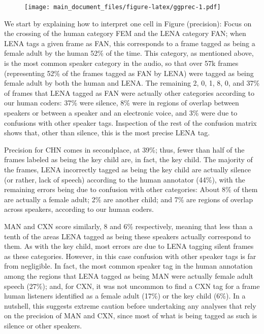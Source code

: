 \documentclass[english,floatsintext,man]{apa6}
\begin{document}
\begin{figure}
\centering
\texttt{[image: main\_document\_files/figure-latex/ggprec-1.pdf]}
\caption{}
\end{figure}

We start by explaining how to interpret one cell in Figure (precision):
Focus on the crossing of the human category FEM and the LENA category
FAN; when LENA tags a given frame as FAN, this corresponds to a frame
tagged as being a female adult by the human 52\% of the time. This
category, as mentioned above, is the most common speaker category in the
audio, so that over 57k frames (representing 52\% of the frames tagged
as FAN by LENA) were tagged as being female adult by both the human and
LENA. The remaining 2, 0, 1, 8, 0, and 37\% of frames that LENA tagged
as FAN were actually other categories according to our human coders:
37\% were silence, 8\% were in regions of overlap between speakers or
between a speaker and an electronic voice, and 3\% were due to
confusions with other speaker tags. Inspection of the rest of the
confusion matrix shows that, other than silence, this is the most
precise LENA tag.

Precision for CHN comes in secondplace, at 39\%; thus, fewer than half
of the frames labeled as being the key child are, in fact, the key
child. The majority of the frames, LENA incorrectly tagged as being the
key child are actually silence (or rather, lack of speech) according to
the human annotator (44\%), with the remaining errors being due to
confusion with other categories: About 8\% of them are actually a female
adult; 2\% are another child; and 7\% are regions of overlap across
speakers, according to our human coders.

MAN and CXN score similarly, 8 and 6\% respectively, meaning that less
than a tenth of the areas LENA tagged as being these speakers actually
correspond to them. As with the key child, most errors are due to LENA
tagging silent frames as these categories. However, in this case
confusion with other speaker tags is far from negligible. In fact, the
most common speaker tag in the human annotation among the regions that
LENA tagged as being MAN were actually female adult speech (27\%); and,
for CXN, it was not uncommon to find a CXN tag for a frame human
listeners identified as a female adult (17\%) or the key child (6\%). In
a nutshell, this suggests extreme caution before undertaking any
analyses that rely on the precision of MAN and CXN, since most of what
is being tagged as such is silence or other speakers.
\end{document}

